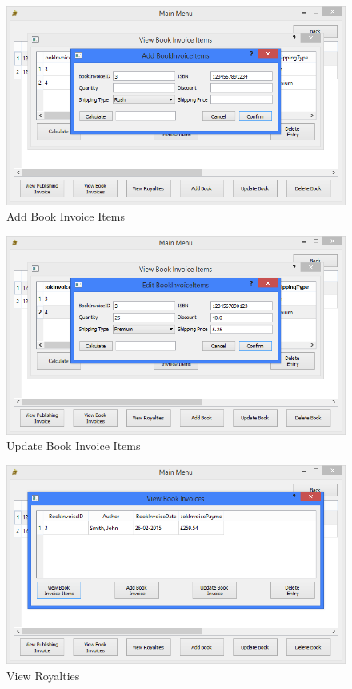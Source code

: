 \begin{figure}[H]
    \caption{Add Book Invoice Items} \label{fig:AddBookInvoiceItems}
    \includegraphics[width=\textwidth]{./Maintenance/UserInterface/AddBookInvoiceItems.png}
\end{figure}

\begin{figure}[H]
    \caption{Update Book Invoice Items} \label{fig:UpdateBookInvoiceItems}
    \includegraphics[width=\textwidth]{./Maintenance/UserInterface/UpdateBookInvoiceItems.png}
\end{figure}

\begin{figure}[H]
    \caption{View Royalties} \label{fig:ViewRoyalties}
    \includegraphics[width=\textwidth]{./Maintenance/UserInterface/ViewBookInvoices.png}
\end{figure}

